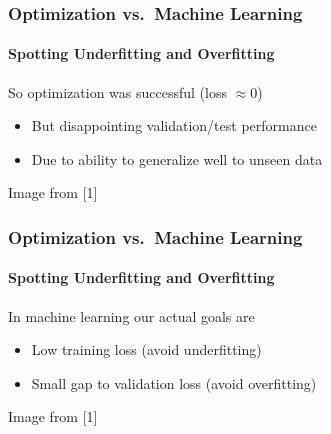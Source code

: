 \documentclass[xetex,professionalfont]{beamer}
\renewcommand\emph[1]{\textcolor{tuwcvl_cvl_blue}{#1}}
\begin{document}
\begin{frame}
\frametitle{Optimization vs.~Machine Learning}
\framesubtitle{Spotting Underfitting and Overfitting}

So optimization was successful (loss $\approx 0$)
\begin{itemize}
    \item But disappointing validation/test performance
    \item Due to ability to \emph{generalize} well to unseen data
\end{itemize}

\smallskip

\begin{center}
{\centering Image from [1]}
\end{center}

\end{frame}


\begin{frame}
\frametitle{Optimization vs.~Machine Learning}
\framesubtitle{Spotting Underfitting and Overfitting}

In machine learning our actual goals are
\begin{itemize}
    \item Low training loss (avoid \emph{underfitting})
    \item Small gap to validation loss (avoid overfitting)
\end{itemize}

\smallskip

\begin{center}
{\centering Image from [1]}
\end{center}

\end{frame}
\end{document}
